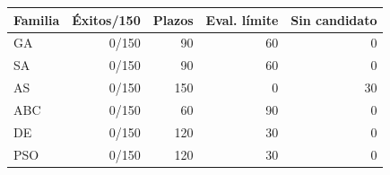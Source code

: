 \begin{tabularx}{\linewidth}{Yrrrr}
\toprule
Familia & Éxitos/150 & Plazos & Eval. límite & Sin candidato \\ \midrule
GA & 0/150 & 90 & 60 & 0 \\
SA & 0/150 & 90 & 60 & 0 \\
AS & 0/150 & 150 & 0 & 30 \\
ABC & 0/150 & 60 & 90 & 0 \\
DE & 0/150 & 120 & 30 & 0 \\
PSO & 0/150 & 120 & 30 & 0 \\
\bottomrule\end{tabularx}
